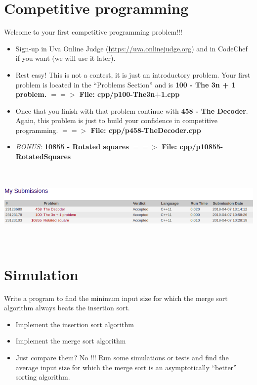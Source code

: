 \documentclass[12pt]{article}
\begin{document}
\section{Competitive programming}

Welcome to your first competitive programming problem!!! 

\begin{itemize}
    \item Sign-up in Uva Online Judge (\url{https://uva.onlinejudge.org}) and in CodeChef if you want (we will use it later).
    \item Rest easy! This is not a contest, it is just an introductory problem. Your first problem is located in the ``Problems Section'' and is \textbf{100 - The 3n + 1 problem. $==>$ File: cpp/p100-The3n+1.cpp}
    
    \item Once that you finish with that problem continue with \textbf{458 - The Decoder}. Again, this problem is just to build your confidence in competitive programming. \textbf{ $==>$ File: cpp/p458-TheDecoder.cpp}
    
    \item \emph{BONUS:} \textbf{10855 - Rotated squares $==>$ File: cpp/p10855-RotatedSquares}
    
\end{itemize}
\begin{center}
\includegraphics[width=14cm, height=4cm]{img/contest.png}
\end{center}

\section{Simulation}

Write a program to find the minimum input size for which the merge sort algorithm always beats the insertion sort.

\begin{itemize}
    \item Implement the insertion sort algorithm
    \item Implement the merge sort algorithm
    \item Just compare them? No !!! Run some simulations or tests and find the average input size for which the merge sort is an asymptotically ``better'' sorting algorithm.
\end{itemize}
\end{document}
